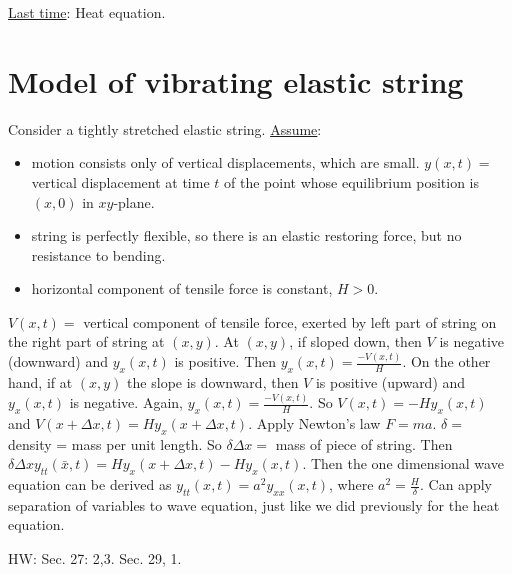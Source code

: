 \documentclass[]{article}
\begin{document}
\underline{Last time}: Heat equation.

\section{Model of vibrating elastic string}

\begin{definition}
	Consider a tightly stretched elastic string.
	\underline{Assume}:
	\begin{itemize}
		\item motion consists only of vertical displacements, which are small. $y(x,t) = $ vertical displacement at time $t$ of the point whose equilibrium position is $(x,0)$ in $xy$-plane.
		\item string is perfectly flexible, so there is an elastic restoring force, but no resistance to bending.
		\item horizontal component of tensile force is constant, $H>0$.
	\end{itemize}

\end{definition}
	$V(x,t) = $ vertical component of tensile force, exerted by left part of string on the right part of string at $(x,y)$. At $(x,y)$, if sloped down, then $V$ is negative (downward) and $y_x(x,t)$ is positive. Then $y_x(x,t) = \frac{-V(x,t)}{H}$. On the other hand, if at $(x,y)$ the slope is downward, then $V$ is positive (upward) and $y_x(x,t)$ is negative. Again, $y_x(x,t) = \frac{-V(x,t)}{H}$. So $V(x,t) = -Hy_x(x,t)$ and $V(x+\Delta x,t) = Hy_x(x+\Delta x, t)$. Apply Newton's law $F=ma$. $\delta = $ density = mass per unit length. So $\delta \Delta x = $ mass of piece of string. Then $\delta \Delta x y_{tt} (\bar{x},t) = Hy_x(x+\Delta x, t) - Hy_x(x,t)$. Then the one dimensional wave equation can be derived as $y_{tt}(x,t) = a^2 y_{xx}(x,t)$, where $a^2 = \frac{H}{\delta}$.
Can apply separation of variables to wave equation, just like we did previously for the heat equation.

HW: Sec. 27: 2,3. Sec. 29, 1.
\end{document}
